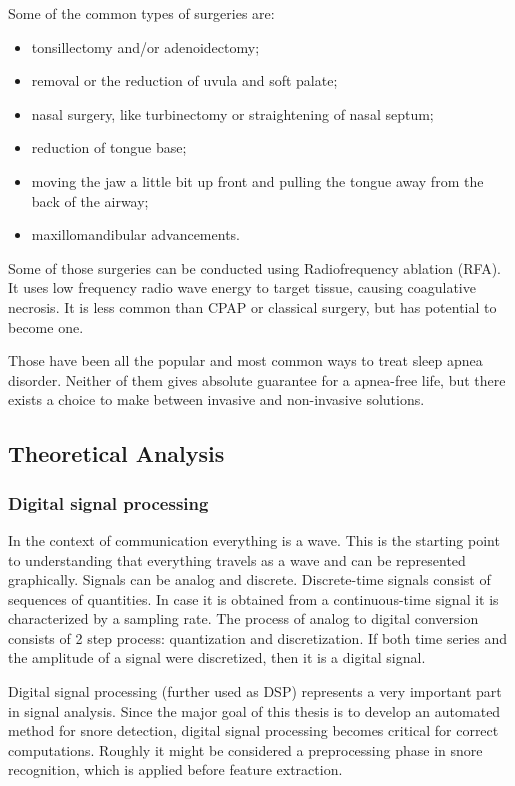 Some of the common types of surgeries are:
\begin{itemize}[topsep=5pt, partopsep=0pt,itemsep=3pt,parsep=1pt]
 \item tonsillectomy and/or adenoidectomy;
 \item removal or the reduction of uvula and soft palate;
 \item nasal surgery, like turbinectomy or straightening of nasal septum;
 \item reduction of tongue base;
 \item moving the jaw a little bit up front and pulling the tongue away from the back of the airway;
 \item maxillomandibular advancements.
\end{itemize}

Some of those surgeries can be conducted using Radiofrequency ablation (RFA). It uses low frequency radio wave energy to target tissue, causing coagulative necrosis. It is less common than CPAP or classical surgery, but has potential to become one.

Those have been all the popular and most common ways to treat sleep apnea disorder. Neither of them gives absolute guarantee for a apnea-free life, but there exists a choice to make between invasive and non-invasive solutions. 

\subsection{Theoretical Analysis}
\subsubsection{Digital signal processing}
In the context of communication everything is a wave. This is the starting point to understanding that everything travels as a wave and can be represented graphically. Signals can be analog and discrete. Discrete-time signals consist of sequences of quantities. In case it is obtained from a continuous-time signal it is characterized by a sampling rate. The process of analog to digital conversion consists of 2 step process: quantization and discretization. If both time series and the amplitude of a signal were discretized, then it is a digital signal.

Digital signal processing (further used as DSP) represents a very important part in signal analysis. Since the major goal of this thesis is to develop an automated method for snore detection, digital signal processing becomes critical for correct computations. Roughly it might be considered a preprocessing phase in snore recognition, which is applied before feature extraction. 

